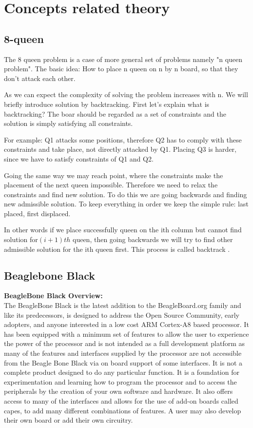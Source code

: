 \documentclass[10pt,a4paper]{article}
\begin{document}
\section{Concepts related theory}
\subsection{8-queen}
	The 8 queen problem is a case of more general set of problems namely "n queen problem". The basic idea: How to place n queen on n by n board, so that they don't attack each other.
	
	As we can expect the complexity of solving the problem increases with n. We will briefly introduce solution by backtracking.  First let's explain what is backtracking? The boar should be regarded as a set of constraints and the solution is simply satisfying all constraints. 
	
	For example: Q1 attacks some positions, therefore Q2 has to comply with these constraints and take place, not directly attacked by Q1. Placing Q3 is harder, since we have to satisfy constraints of Q1 and Q2. 
	
	Going the same way we may reach point, where the constraints make the placement of the next queen impossible. Therefore we need to relax the constraints and find new solution. To do this we are going backwards and finding new admissible solution. To keep everything in order we keep the simple rule: last placed, first displaced. 
	
	In other words if we place successfully queen on the ith column but cannot find solution for$ (i+1)th$ queen, then going backwards we will try to find other admissible solution for the ith queen first. This process is called backtrack  .\\
		
\subsection{Beaglebone Black}
	\textbf{BeagleBone Black Overview:}\\ 
	The BeagleBone Black is the latest addition to the BeagleBoard.org family and like its predecessors, is designed to address the Open Source Community, early adopters, and anyone interested in a low cost ARM Cortex-A8 based processor. It has been equipped with a minimum set of features to allow the user to experience the power of the processor and is not intended as a full development platform as many of the features and interfaces supplied by the processor are not accessible from the Beagle Bone Black via on board support of some interfaces. It is not a complete product designed to do any particular function. It is a foundation for experimentation and learning how to program the processor and to access the peripherals by the creation of your own software and hardware. It also offers access to many of the interfaces and allows for the use of add-on boards called capes, to add many different combinations of features. A user may also develop their own board or add their own circuitry.
	
\end{document}
